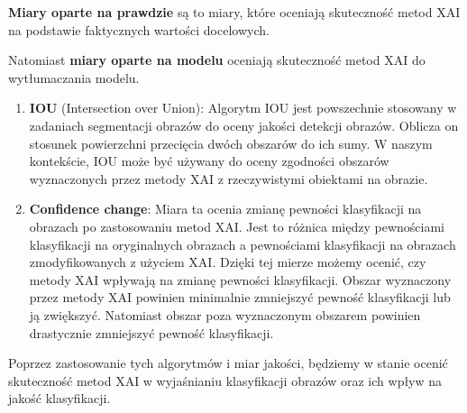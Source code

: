 \textbf{Miary oparte na prawdzie} są to miary, które oceniają skuteczność metod XAI na podstawie faktycznych wartości docelowych.

Natomiast \textbf{miary oparte na modelu} oceniają skuteczność metod XAI do wytłumaczania modelu.

\begin{enumerate}
	\item \textbf{IOU} (Intersection over Union): Algorytm IOU jest powszechnie stosowany w zadaniach segmentacji obrazów do oceny jakości detekcji obrazów.
	      Oblicza on stosunek powierzchni przecięcia dwóch obszarów do ich sumy.
	      W naszym kontekście, IOU może być używany do oceny zgodności obszarów wyznaczonych przez metody XAI z rzeczywistymi obiektami na obrazie.

	\item \textbf{Confidence change}: Miara ta ocenia zmianę pewności klasyfikacji na obrazach po zastosowaniu metod XAI.
	      Jest to różnica między pewnościami klasyfikacji na oryginalnych obrazach a pewnościami klasyfikacji na obrazach zmodyfikowanych z użyciem XAI.
	      Dzięki tej mierze możemy ocenić, czy metody XAI wpływają na zmianę pewności klasyfikacji.
	      Obszar wyznaczony przez metody XAI powinien minimalnie zmniejszyć pewność klasyfikacji lub ją zwiększyć.
	      Natomiast obszar poza wyznaczonym obszarem powinien drastycznie zmniejszyć pewność klasyfikacji.
\end{enumerate}

Poprzez zastosowanie tych algorytmów i miar jakości, będziemy w stanie ocenić skuteczność metod XAI w wyjaśnianiu klasyfikacji obrazów oraz ich wpływ na jakość klasyfikacji.

